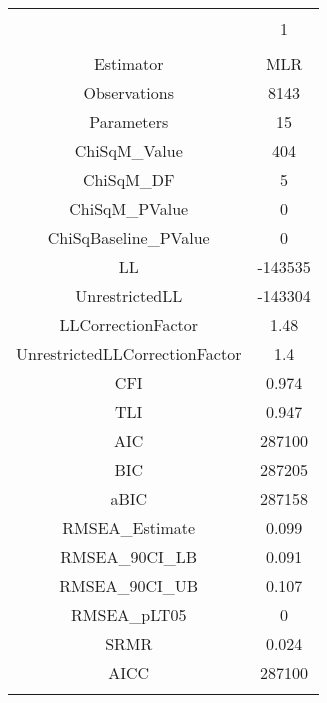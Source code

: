 
\begin{table}[!htbp] \centering 
  \caption{} 
  \label{} 
\begin{tabular}{@{\extracolsep{5pt}} cc} 
\\[-1.8ex]\hline 
\hline \\[-1.8ex] 
 & 1 \\ 
\hline \\[-1.8ex] 
Estimator & MLR \\ 
Observations & 8143 \\ 
Parameters & 15 \\ 
ChiSqM\_Value & 404 \\ 
ChiSqM\_DF & 5 \\ 
ChiSqM\_PValue & 0 \\ 
ChiSqBaseline\_PValue & 0 \\ 
LL & -143535 \\ 
UnrestrictedLL & -143304 \\ 
LLCorrectionFactor & 1.48 \\ 
UnrestrictedLLCorrectionFactor & 1.4 \\ 
CFI & 0.974 \\ 
TLI & 0.947 \\ 
AIC & 287100 \\ 
BIC & 287205 \\ 
aBIC & 287158 \\ 
RMSEA\_Estimate & 0.099 \\ 
RMSEA\_90CI\_LB & 0.091 \\ 
RMSEA\_90CI\_UB & 0.107 \\ 
RMSEA\_pLT05 & 0 \\ 
SRMR & 0.024 \\ 
AICC & 287100 \\ 
\hline \\[-1.8ex] 
\end{tabular} 
\end{table} 

